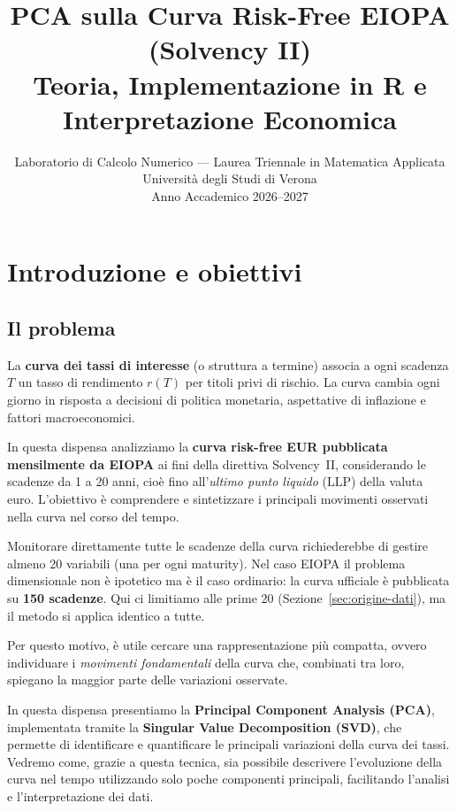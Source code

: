 \documentclass[11pt,a4paper]{article}
\title{%
  \textbf{PCA sulla Curva Risk-Free EIOPA (Solvency II)}\\[6pt]
  \large Teoria, Implementazione in R e Interpretazione Economica\\[4pt]
}
\author{Laboratorio di Calcolo Numerico --- Laurea Triennale in Matematica Applicata\\
  Universit\`a degli Studi di Verona\\[2pt]
  Anno Accademico 2026--2027}
\date{}
\newcommand{\LLP}{\ensuremath{\mathrm{LLP}}}
\theoremstyle{plain}
\theoremstyle{definition}
\theoremstyle{remark}
\begin{document}
\maketitle
\tableofcontents
\newpage

\section{Introduzione e obiettivi}

\subsection{Il problema}

La \textbf{curva dei tassi di interesse} (o struttura a termine) associa a ogni
scadenza $T$ un tasso di rendimento $r(T)$ per titoli privi di rischio. La curva
cambia ogni giorno in risposta a decisioni di politica monetaria, aspettative di
inflazione e fattori macroeconomici.

In questa dispensa analizziamo la \textbf{curva risk-free EUR pubblicata
mensilmente da EIOPA} ai fini della direttiva Solvency~II, considerando le
scadenze da 1 a 20 anni, cio\`e fino all'\emph{ultimo punto liquido} ($\LLP$)
della valuta euro. L'obiettivo \`e comprendere e sintetizzare i principali
movimenti osservati nella curva nel corso del tempo.

Monitorare direttamente tutte le scadenze della curva richiederebbe di gestire
almeno 20 variabili (una per ogni maturity). Nel caso EIOPA il problema
dimensionale non \`e ipotetico ma \`e il caso ordinario: la curva ufficiale
\`e pubblicata su \textbf{150 scadenze}. Qui ci limitiamo alle prime 20
(Sezione~\ref{sec:origine-dati}), ma il metodo si applica identico a tutte.

Per questo motivo, \`e utile cercare una rappresentazione pi\`u compatta, ovvero
individuare i \emph{movimenti fondamentali} della curva che, combinati tra loro,
spiegano la maggior parte delle variazioni osservate.

In questa dispensa presentiamo la \textbf{Principal Component Analysis (PCA)},
implementata tramite la \textbf{Singular Value Decomposition (SVD)}, che permette
di identificare e quantificare le principali variazioni della curva dei tassi.
Vedremo come, grazie a questa tecnica, sia possibile descrivere l'evoluzione
della curva nel tempo utilizzando solo poche componenti principali, facilitando
l'analisi e l'interpretazione dei dati.
\end{document}
